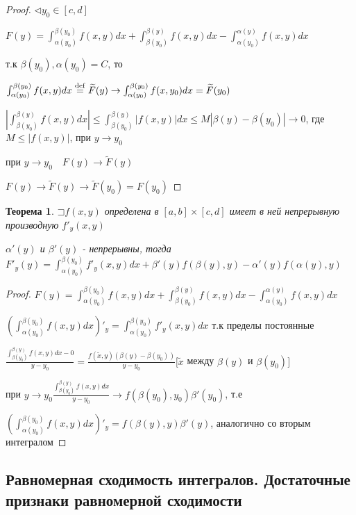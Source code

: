 \documentclass[a4paper]{article}
\newcommand\letsymbol{\mathord{\sqsupset}}
\newtheorem{theorem}{Теорема}[section]
\theoremstyle{definition}
\theoremstyle{remark}
\begin{document}
\begin{proof}
     $\triangleleft y_0\in[c,d]$

     $F(y) = \int_{\alpha(y_0)}^{\beta(y_0)}f(x,y)dx + \int_{\beta(y_0)}^{\beta(y)}f(x,y)dx - \int_{\alpha(y_0)}^{\alpha(y)}f(x,y)dx$

     т.к $\beta(y_0), \alpha(y_0) = C$, то 

     $\int_{\alpha(y_0)}^{\beta(y_0)}f(x,y)dx \stackrel{\rm{def}}{=}\widetilde{F}(y)\rightarrow \int_{\alpha(y_0)}^{\beta(y_0)}f(x,y_0)dx = \widetilde{F}(y_0)$

     $|\int_{\beta(y_0)}^{\beta(y)}f(x,y)dx| \leq \int_{\beta(y_0)}^{\beta(y)}|f(x,y)|dx \leq M |\beta(y)-\beta(y_0)|\to 0$, где
     $M \leq |f(x,y)|$, при $y\to y_0$

     при $y \to y_0 \quad F(y) \to \widetilde{F}(y)$

     $F(y)\to \widetilde{F}(y) \to \widetilde{F}(y_0) = F(y_0)$
\end{proof}

\begin{theorem}
     $\letsymbol{}f(x,y)$ определена в $[a,b]\times[c,d]$ имеет в ней непрерывную производную $f'_y(x,y)$

     $\alpha'(y)$ и $\beta'(y)$ - непрерывны, тогда $F'_y(y) = \int_{\alpha(y_0)}^{\beta(y_0)}f'_y(x,y)dx + \beta'(y)f(\beta(y), y) - \alpha'(y)f(\alpha(y), y)$
\end{theorem}

\begin{proof}
     $F(y) = \int_{\alpha(y_0)}^{\beta(y_0)}f(x,y)dx + \int_{\beta(y_0)}^{\beta(y)}f(x,y)dx - \int_{\alpha(y_0)}^{\alpha(y)}f(x,y)dx$

     $(\int_{\alpha(y_0)}^{\beta(y_0)}f(x,y)dx)'_y = \int_{\alpha(y_0)}^{\beta(y_0)}f'_y(x,y)dx$ т.к пределы постоянные

     $\frac{\int_{\beta(y_0)}^{\beta(y)} f(x,y)dx - 0}{y-y_0} = \frac{f(\widetilde{x}, y) (\beta(y) - \beta(y_0))}{y-y_0} [\widetilde{x}$ между $\beta(y)$ и $\beta(y_0)]$

     при $y  \to y_0 \frac{\int_{\beta(y_0)}^{\beta(y)} f(x,y)dx}{y-y_0} \to f(\beta(y_0), y_0)\beta'(y_0)$, т.е
     
     $(\int_{\alpha(y_0)}^{\beta(y_0)}f(x,y)dx)'_y = f(\beta(y), y)\beta'(y)$, аналогично со вторым интегралом
\end{proof}
    \subsection{	Равномерная сходимость интегралов. Достаточные признаки равномерной сходимости}
\end{document}
